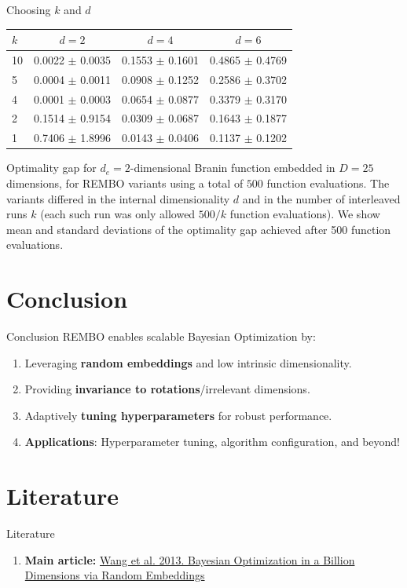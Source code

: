 \documentclass[aspectratio=169]{beamer}
\begin{document}
\begin{frame}{Choosing $k$ and $d$}
    \begin{table}[h]
    \small
    \begin{center}
    \begin{tabular}{ l |  c  c  c}
    \hline
    $k$ & $d=2$ & $d=4$ & $d=6$ \\
    \hline
      10& 0.0022 $\pm$ 0.0035 & 0.1553 $\pm$ 0.1601 & 0.4865 $\pm$  0.4769 \\
      5 & 0.0004 $\pm$ 0.0011 & 0.0908 $\pm$ 0.1252 & 0.2586 $\pm$ 0.3702 \\
      4 & 0.0001 $\pm$ 0.0003 & 0.0654 $\pm$ 0.0877 & 0.3379 $\pm$ 0.3170 \\
      2 & 0.1514 $\pm$ 0.9154 & 0.0309 $\pm$ 0.0687 & 0.1643 $\pm$ 0.1877 \\
      1 & 0.7406 $\pm$ 1.8996 & 0.0143 $\pm$ 0.0406 & 0.1137 $\pm$ 0.1202 \\
    \end{tabular}
    \end{center}
    \end{table}
    Optimality gap for $d_e=2$-dimensional Branin function embedded in $D=25$ dimensions, for
    REMBO variants using a total of $500$ function evaluations. The variants differed in the internal dimensionality $d$ and in the number of interleaved runs $k$ (each such run was only allowed $500/k$ function evaluations).
    We show mean and standard deviations of the optimality gap achieved after 500 function evaluations.
\end{frame}

\section{Conclusion}
\begin{frame}{Conclusion}
    REMBO enables scalable Bayesian Optimization by:
    \begin{enumerate}
        \item Leveraging \textbf{random embeddings} and low intrinsic dimensionality.
        \item Providing \textbf{invariance to rotations}/irrelevant dimensions.
        \item Adaptively \textbf{tuning hyperparameters} for robust performance.
        \item \textbf{Applications}: Hyperparameter tuning, algorithm configuration, and beyond!
    \end{enumerate}
\end{frame}

\section{Literature}
\begin{frame}{Literature}
    \begin{enumerate}
        \item \textbf{Main article:} \href{https://arxiv.org/abs/1301.1942}
        {Wang et al. 2013. Bayesian Optimization in a Billion Dimensions via Random Embeddings}
    \end{enumerate}
\end{frame}
\end{document}
